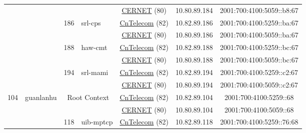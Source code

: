 \begin{small}
\begin{center}
\begin{longtable}{|c|c|c|c|c|c|c|c|}
  &  &  &  & \multicolumn{2}{|c|}{\tiny{\href{http://www.cernet.edu.cn}{CERNET} (80)}} & \tiny{10.80.89.184} & \tiny{2001:700:4100:5059::b8:67} \\* \cline{3-3}\cline{4-4}\cline{5-5}\cline{6-6}\cline{7-7}\cline{8-8}
  &  & \multirow{2}{*}{\tiny{186}} & \multicolumn{1}{|l|}{\multirow{2}{*}{\tiny{srl-cps}}} & \multicolumn{2}{|c|}{\tiny{\href{http://www.chinatelecom.com.cn}{CnTelecom} (82)}} & \tiny{10.82.89.186} & \tiny{2001:700:4100:5259::ba:67} \\* \cline{5-5}\cline{6-6}\cline{7-7}\cline{8-8}
  &  &  &  & \multicolumn{2}{|c|}{\tiny{\href{http://www.cernet.edu.cn}{CERNET} (80)}} & \tiny{10.80.89.186} & \tiny{2001:700:4100:5059::ba:67} \\* \cline{3-3}\cline{4-4}\cline{5-5}\cline{6-6}\cline{7-7}\cline{8-8}
  &  & \multirow{2}{*}{\tiny{188}} & \multicolumn{1}{|l|}{\multirow{2}{*}{\tiny{haw-cmt}}} & \multicolumn{2}{|c|}{\tiny{\href{http://www.chinatelecom.com.cn}{CnTelecom} (82)}} & \tiny{10.82.89.188} & \tiny{2001:700:4100:5259::bc:67} \\* \cline{5-5}\cline{6-6}\cline{7-7}\cline{8-8}
  &  &  &  & \multicolumn{2}{|c|}{\tiny{\href{http://www.cernet.edu.cn}{CERNET} (80)}} & \tiny{10.80.89.188} & \tiny{2001:700:4100:5059::bc:67} \\* \cline{3-3}\cline{4-4}\cline{5-5}\cline{6-6}\cline{7-7}\cline{8-8}
  &  & \multirow{2}{*}{\tiny{194}} & \multicolumn{1}{|l|}{\multirow{2}{*}{\tiny{srl-mami}}} & \multicolumn{2}{|c|}{\tiny{\href{http://www.chinatelecom.com.cn}{CnTelecom} (82)}} & \tiny{10.82.89.194} & \tiny{2001:700:4100:5259::c2:67} \\* \cline{5-5}\cline{6-6}\cline{7-7}\cline{8-8}
  &  &  &  & \multicolumn{2}{|c|}{\tiny{\href{http://www.cernet.edu.cn}{CERNET} (80)}} & \tiny{10.80.89.194} & \tiny{2001:700:4100:5059::c2:67} \\ \hline
 \multirow{26}{*}{\tiny{104}} & \multicolumn{1}{|l|}{\multirow{26}{*}{\tiny{guanlanhu}}} & \multicolumn{2}{|c|}{\multirow{2}{*}{\tiny{Root Context}}} & \multicolumn{2}{|c|}{\tiny{\href{http://www.chinatelecom.com.cn}{CnTelecom} (82)}} & \tiny{10.82.89.104} & \tiny{2001:700:4100:5259::68} \\* \cline{5-5}\cline{6-6}\cline{7-7}\cline{8-8}
  &  & \multicolumn{2}{|c|}{} & \multicolumn{2}{|c|}{\tiny{\href{http://www.cernet.edu.cn}{CERNET} (80)}} & \tiny{10.80.89.104} & \tiny{2001:700:4100:5059::68} \\* \cline{3-3}\cline{4-4}\cline{5-5}\cline{6-6}\cline{7-7}\cline{8-8}
  &  & \multirow{2}{*}{\tiny{118}} & \multicolumn{1}{|l|}{\multirow{2}{*}{\tiny{uib-mptcp}}} & \multicolumn{2}{|c|}{\tiny{\href{http://www.chinatelecom.com.cn}{CnTelecom} (82)}} & \tiny{10.82.89.118} & \tiny{2001:700:4100:5259::76:68} \\* \cline{5-5}\cline{6-6}\cline{7-7}\cline{8-8}

\end{longtable}
\end{center}
\end{small}
